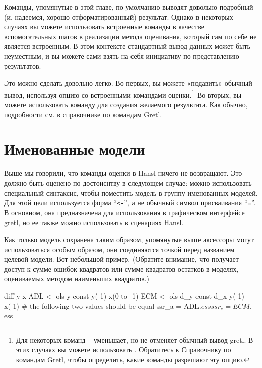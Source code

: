 Команды, упомянутые в этой главе, по умолчанию выводят довольно
подробный (и, надеемся, хорошо отформатированный) результат. Однако в
некоторых случаях вы можете использовать встроенные команды в качестве
вспомогательных шагов в реализации метода оценивания, который сам по
себе не является встроенным. В этом контексте стандартный вывод данных
может быть неуместным, и вы можете сами взять на себя инициативу по
представлению результатов.

Это можно сделать довольно легко. Во-первых, вы можете «подавить»
обычный вывод, используя опцию  со встроенными командами
оценки.\footnote{Для некоторых команд -- уменьшает, но
  не отменяет обычный вывод gretl. В этих случаях вы можете
  использовать . Обратитесь к Справочнику по командам
  Gretl, чтобы определить, какие команды разрешают эту опцию.}
Во-вторых, вы можете использовать команду  для создания
желаемого результата. Как обычно, подробности см. в справочнике по
командам Gretl.

\section{Именованные модели}

Выше мы говорили, что команды оценки в Hansl ничего не возвращают. Это
должно быть оценено по достоиснтву в следующем случае: можно
использовать специальный синтаксис, чтобы поместить модель в группу
именованных моделей. Для этой цели используется форма ``\verb|<-|'', а
не обычный символ присваивания ``\verb|=|''.  В основном, она
предназначена для использования в графическом интерфейсе gretl, но ее
также можно использовать в сценариях Hansl.

Как только модель сохранена таким образом, упомянутые выше аксессоры
могут использоваться особым образом, они соединяются точкой перед
названием целевой модели. Вот небольшой пример. (Обратите внимание,
что  получает доступ к сумме ошибок квадратов или сумме
квадратов остатков в моделях, оцениваемых методом наименьших
квадратов.)

\begin{code}
diff y x
ADL <- ols y const y(-1) x(0 to -1)
ECM <- ols d_y const d_x y(-1) x(-1)
# the following two values should be equal
ssr_a = ADL.$ess
ssr_e = ECM.$ess
\end{code}


